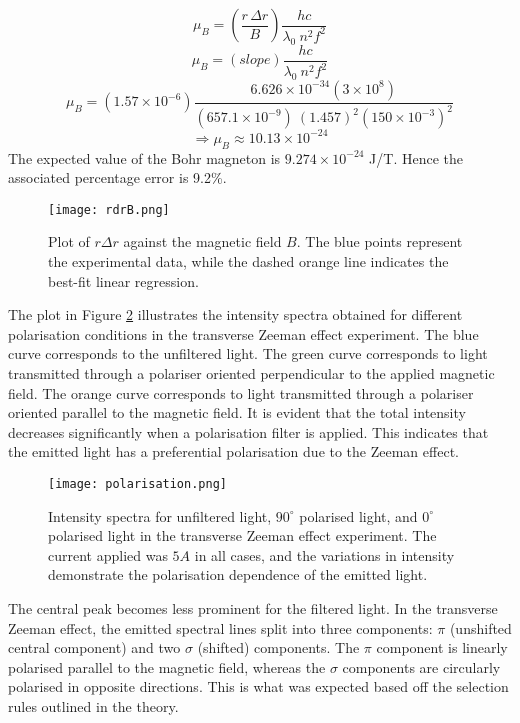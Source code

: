 \documentclass[11pt,twocolumn, a4paper]{article}
\numberwithin{equation}{section} %
\numberwithin{figure}{section} %
\numberwithin{table}{section} %
\begin{document}
\[
\mu_B = \left(\frac{r\,\Delta r}{B}\right) \frac{hc}{\lambda_0\ n^2 f^2}
\]
\[
\mu_B = \left(slope\right) \frac{hc}{\lambda_0\ n^2 f^2}
\]
\[
\mu_B = \left( 1.57 \times 10^{-6}  \right) \frac{6.626 \times 10^{-34}(3 \times 10^{8})}{(657.1 \times 10^{-9})\ (1.457)^2 (150 \times 10^{-3})^2}
\]
\[
\Rightarrow \mu_B \approx 10.13 \times 10^{-24}
\]
The expected value of the Bohr magneton is \(9.274 \times 10^{-24}\) J/T. Hence the associated percentage error is 9.2\%.
\begin{figure}[H]
    \centering
    \texttt{[image: rdrB.png]}
    \caption{Plot of \(r\Delta r\) against the magnetic field $B$. The blue points represent the experimental data, while the dashed orange line indicates the best-fit linear regression.}
    \label{fig:rdrB}
\end{figure}
The plot in Figure \ref{fig:exp2pol} illustrates the intensity spectra obtained for different polarisation conditions in the transverse Zeeman effect experiment. The blue curve corresponds to the unfiltered light. The green curve corresponds to light transmitted through a polariser oriented perpendicular to the applied magnetic field.  The orange curve corresponds to light transmitted through a polariser oriented parallel to the magnetic field. It is evident that the total intensity decreases significantly when a polarisation filter is applied. This indicates that the emitted light has a preferential polarisation due to the Zeeman effect.
\begin{figure}[H]
    \centering
    \texttt{[image: polarisation.png]}
    \caption{Intensity spectra for unfiltered light, \(90^{\circ}\) polarised light, and \(0^{\circ}\) polarised light in the transverse Zeeman effect experiment. The current applied was $5A$ in all cases, and the variations in intensity demonstrate the polarisation dependence of the emitted light. }
    \label{fig:exp2pol}
\end{figure}
The central peak becomes less prominent for the filtered light. In the transverse Zeeman effect, the emitted spectral lines split into three components: \(\pi\) (unshifted central component) and two \(\sigma\) (shifted) components. The \(\pi\) component is linearly polarised parallel to the magnetic field, whereas the \(\sigma\) components are circularly polarised in opposite directions. This is what was expected based off the selection rules outlined in the theory. 
\end{document}

